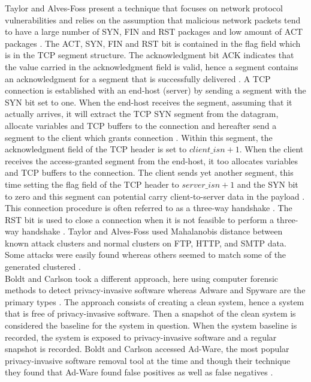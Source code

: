\documentclass[12pt]{article} %
\begin{document}
Taylor and Alves-Foss present a technique that focuses on network protocol vulnerabilities and relies on the assumption that malicious network packets tend to have a large number of SYN, FIN and RST packages and low amount of ACT packages \cite{idika2007survey}. The ACT, SYN, FIN and RST bit is contained in the flag field which is in the TCP segment structure. The acknowledgment bit ACK indicates that the value carried in the acknowledgment field is valid, hence a segment contains an acknowledgment for a segment that is successfully delivered \cite{kurose2010computer}. A TCP connection is established with an end-host (server) by sending a segment with the SYN bit set to one. When the end-host receives the segment, assuming that it actually arrives, it will extract the TCP SYN segment from the datagram, allocate variables and TCP buffers to the connection and hereafter send a segment to the client which grants connection \cite{kurose2010computer}.  Within this segment, the acknowledgment field of the TCP header is set to $client\_isn+1$. When the client receives the access-granted segment from the end-host, it too allocates variables and TCP buffers to the connection. The client sends yet another segment, this time setting the flag field of the TCP header to $server\_isn+1$ and the SYN bit to zero and this segment can potential carry client-to-server data in the payload \cite{kurose2010computer}. This connection procedure is often referred to as a three-way handshake \cite{kurose2010computer}. The RST bit is used to close a connection when it is not feasible to perform a three-way handshake \cite{deri2000practical}. Taylor and Alves-Foss used Mahalanobis distance between known attack clusters and normal clusters on FTP, HTTP, and SMTP data. Some attacks were easily found whereas others seemed to match some of the generated clustered \cite{idika2007survey}. \\
Boldt and Carlson took a different approach, here using computer forensic methods to detect privacy-invasive software whereas Adware and Spyware are the primary types \cite{idika2007survey}. The approach consists of creating a clean system, hence a system that is free of privacy-invasive software. Then a snapshot of the clean system is considered the baseline for the system in question. When the system baseline is recorded, the system is exposed to privacy-invasive software and a regular snapshot is recorded. Boldt and Carlson accessed Ad-Ware, the most popular privacy-invasive software removal tool at the time and though their technique they found that Ad-Ware found false positives as well as false negatives \cite{idika2007survey}. \\
\end{document}
